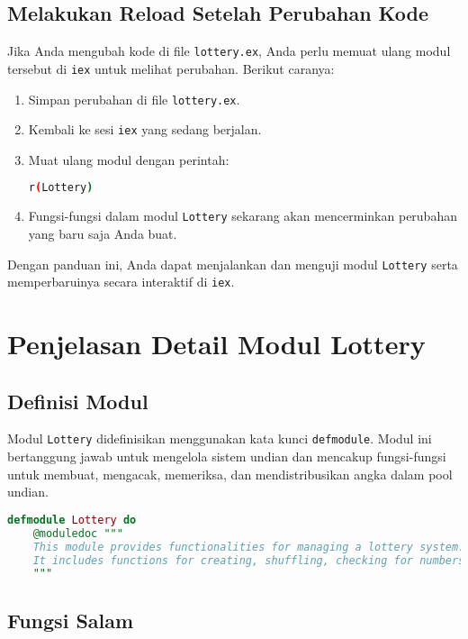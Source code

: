 \subsection{Melakukan Reload Setelah Perubahan Kode}

Jika Anda mengubah kode di file \texttt{lottery.ex}, Anda perlu memuat ulang modul tersebut di \texttt{iex} untuk melihat perubahan. Berikut caranya:

\begin{enumerate}
	\item Simpan perubahan di file \texttt{lottery.ex}.
	\item Kembali ke sesi \texttt{iex} yang sedang berjalan.
	\item Muat ulang modul dengan perintah:
	\begin{lstlisting}[language=bash]
		r(Lottery)
	\end{lstlisting}
	\item Fungsi-fungsi dalam modul \texttt{Lottery} sekarang akan mencerminkan perubahan yang baru saja Anda buat.
\end{enumerate}

Dengan panduan ini, Anda dapat menjalankan dan menguji modul \texttt{Lottery} serta memperbaruinya secara interaktif di \texttt{iex}.


\section{Penjelasan Detail Modul Lottery}

\subsection{Definisi Modul}

Modul \texttt{Lottery} didefinisikan menggunakan kata kunci \texttt{defmodule}. Modul ini bertanggung jawab untuk mengelola sistem undian dan mencakup fungsi-fungsi untuk membuat, mengacak, memeriksa, dan mendistribusikan angka dalam pool undian.

\begin{lstlisting}[language=elixir, caption={Definisi Modul Lottery}]
	defmodule Lottery do
	@moduledoc """
	This module provides functionalities for managing a lottery system.
	It includes functions for creating, shuffling, checking for numbers, and distributing numbers within the lottery pool.
	"""
\end{lstlisting}

\subsection{Fungsi Salam}

